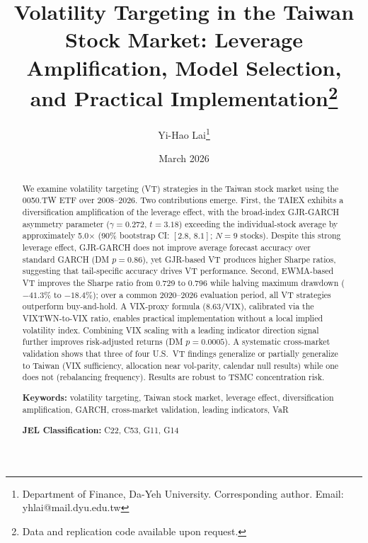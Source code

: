 \documentclass[12pt,a4paper]{article}
\title{Volatility Targeting in the Taiwan Stock Market: Leverage Amplification, Model Selection, and Practical Implementation\thanks{Data and replication code available upon request.}}
\author{Yi-Hao Lai\thanks{Department of Finance, Da-Yeh University. Corresponding author. Email: yhlai@mail.dyu.edu.tw}}
\date{March 2026}
\begin{document}
\maketitle

\begin{abstract}
\noindent
We examine volatility targeting (VT) strategies in the Taiwan stock market using the 0050.TW ETF over 2008--2026. Two contributions emerge. First, the TAIEX exhibits a diversification amplification of the leverage effect, with the broad-index GJR-GARCH asymmetry parameter ($\gamma = 0.272$, $t = 3.18$) exceeding the individual-stock average by approximately 5.0$\times$ (90\% bootstrap CI: $[2.8, \, 8.1]$; $N = 9$ stocks). Despite this strong leverage effect, GJR-GARCH does not improve average forecast accuracy over standard GARCH (DM $p = 0.86$), yet GJR-based VT produces higher Sharpe ratios, suggesting that tail-specific accuracy drives VT performance. Second, EWMA-based VT improves the Sharpe ratio from 0.729 to 0.796 while halving maximum drawdown ($-41.3\%$ to $-18.4\%$); over a common 2020--2026 evaluation period, all VT strategies outperform buy-and-hold. A VIX-proxy formula ($8.63/\text{VIX}$), calibrated via the VIXTWN-to-VIX ratio, enables practical implementation without a local implied volatility index. Combining VIX scaling with a leading indicator direction signal further improves risk-adjusted returns (DM $p = 0.0005$). A systematic cross-market validation shows that three of four U.S.\ VT findings generalize or partially generalize to Taiwan (VIX sufficiency, allocation near vol-parity, calendar null results) while one does not (rebalancing frequency). Results are robust to TSMC concentration risk.

\medskip
\noindent
\textbf{Keywords:} volatility targeting, Taiwan stock market, leverage effect, diversification amplification, GARCH, cross-market validation, leading indicators, VaR

\medskip
\noindent
\textbf{JEL Classification:} C22, C53, G11, G14
\end{abstract}


\end{document}
